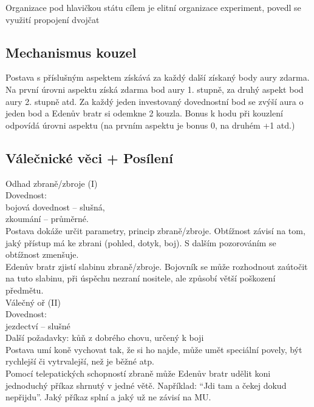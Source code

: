 \documentclass[../../main.tex]{subfiles}
\begin{document}
Organizace
pod hlavičkou státu
cílem je elitní organizace
experiment, povedl se
využití propojení dvojčat

\subsection{Mechanismus kouzel}
\label{sec:eden-mech-kouzla}

Postava s příslušným aspektem získává za každý další získaný body aury zdarma. Na první úrovni aspektu získá zdarma bod aury 1. stupně, za druhý aspekt bod aury 2. stupně atd. Za každý jeden investovaný dovednostní bod se zvýší aura o jeden bod a Edenův bratr si odemkne 2 kouzla. Bonus k hodu při kouzlení odpovídá úrovni aspektu (na prvním aspektu je bonus 0, na druhém +1 atd.)\\

\subsection{Válečnické věci + Posílení}
\label{sec:eden-valecnici-posileni}

Odhad zbraně/zbroje (I)\\
Dovednost:\\
bojová dovednost – slušná,\\
zkoumání – průměrné.\\
Postava dokáže určit parametry, princip zbraně/zbroje. Obtížnost závisí na tom, jaký přístup má ke zbrani (pohled, dotyk, boj). S dalším pozorováním se obtížnost zmenšuje.\\
Edenův bratr zjistí slabinu zbraně/zbroje. Bojovník se může rozhodnout zaútočit na tuto slabinu, při úspěchu nezraní nositele, ale způsobí větší poškození předmětu.\\


Válečný oř (II)\\
Dovednost:\\
 jezdectví – slušné\\
Další požadavky: kůň z dobrého chovu, určený k boji\\
Postava umí koně vychovat tak, že si ho najde, může umět speciální povely, být rychlejší či vytrvalejší, než je běžné atp.\\
Pomocí telepatických schopností zbraně může Edenův bratr udělit koni jednoduchý příkaz shrnutý v jedné větě. Například: “Jdi tam a čekej dokud nepřijdu”. Jaký příkaz splní a jaký už ne závisí na MU.\\
\end{document}
